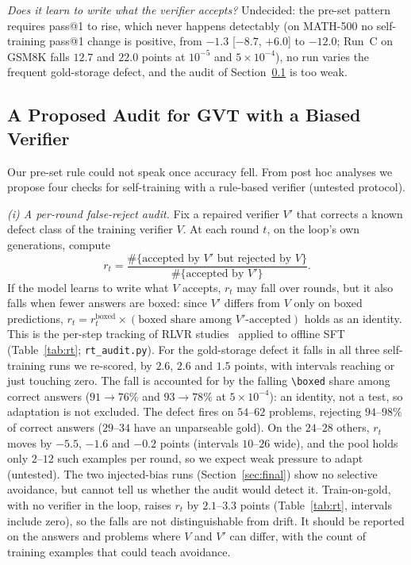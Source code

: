 \documentclass[runningheads]{llncs}
\begin{document}
\emph{Does it learn to write what the verifier accepts?} Undecided: the pre-set pattern requires pass@1 to rise, which never happens
detectably (on MATH-500 no self-training pass@1 change is positive, from $-1.3$ [$-8.7$, $+6.0$] to $-12.0$; Run~C on GSM8K falls $12.7$ and $22.0$ points at $10^{-5}$ and $5\times10^{-4}$), no run varies the frequent gold-storage defect, and the audit of Section~\ref{sec:audit} is too weak.

\subsection{A Proposed Audit for GVT with a Biased Verifier}
\label{sec:audit}

Our pre-set rule could not speak once accuracy fell. From post hoc analyses we propose four
checks for self-training with a rule-based verifier (untested protocol).

\emph{(i) A per-round false-reject audit.} Fix a repaired verifier $V'$ that
corrects a known defect class of the training verifier $V$. At each round $t$,
on the loop's own generations, compute
\[
r_t = \frac{\#\{\text{accepted by } V' \text{ but rejected by } V\}}{\#\{\text{accepted by } V'\}} .
\]
If the model learns to write what $V$ accepts, $r_t$ may fall over rounds, but
it also falls when fewer answers are boxed: since $V'$ differs from $V$ only on boxed
predictions, $r_t=r_t^{\text{boxed}}\times(\text{boxed share among }V'\text{-accepted})$ holds as an identity. This is the per-step tracking of
RLVR studies~\cite{ref_delayplateau,ref_tinyv} applied to offline SFT (Table~\ref{tab:rt}; \texttt{rt\_audit.py}).
For the gold-storage defect it falls in all three self-training runs we re-scored,
by $2.6$, $2.6$ and $1.5$ points, with intervals reaching or just touching
zero. The fall is accounted for by the falling
\verb|\boxed| share among correct answers ($91\to76\%$ and $93\to78\%$ at
$5\times10^{-4}$): an identity, not a test, so adaptation is not excluded. The defect fires on $54$--$62$
problems, rejecting $94$--$98\%$ of correct answers ($29$--$34$ have an unparseable gold). On the $24$--$28$ others, $r_t$ moves by $-5.5$, $-1.6$ and $-0.2$
points (intervals $10$--$26$ wide), and the pool
holds only $2$--$12$ such examples per round, so we expect weak pressure to adapt (untested). The two injected-bias runs
(Section~\ref{sec:final}) show no selective avoidance, but cannot tell us whether the audit would detect it.
Train-on-gold, with no verifier in the loop, raises
$r_t$ by $2.1$--$3.3$ points (Table~\ref{tab:rt}, intervals include zero), so the falls are not distinguishable from drift. It should be reported on
the answers and problems where $V$ and $V'$ can differ, with the count of training examples that could teach avoidance.
\end{document}
